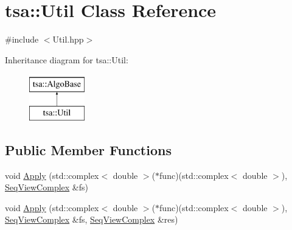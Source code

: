 \hypertarget{classtsa_1_1_util}{}\section{tsa\+:\+:Util Class Reference}
\label{classtsa_1_1_util}


{\ttfamily \#include $<$Util.\+hpp$>$}

Inheritance diagram for tsa\+:\+:Util\+:\begin{figure}[H]
\begin{center}
\leavevmode
\includegraphics[height=2.000000cm]{classtsa_1_1_util}
\end{center}
\end{figure}
\subsection*{Public Member Functions}
\begin{DoxyCompactItemize}
\item 
void \hyperlink{classtsa_1_1_util_a739335d45cc8262c48457f760844b57e}{Apply} (std\+::complex$<$ double $>$($\ast$func)(std\+::complex$<$ double $>$), \hyperlink{namespacetsa_ab32775c889b53c40fa83939f22372b75}{Seq\+View\+Complex} \&fs)
\item 
void \hyperlink{classtsa_1_1_util_af2b974e7bd7581f138b00db9640b3813}{Apply} (std\+::complex$<$ double $>$($\ast$func)(std\+::complex$<$ double $>$), \hyperlink{namespacetsa_ab32775c889b53c40fa83939f22372b75}{Seq\+View\+Complex} \&fs, \hyperlink{namespacetsa_ab32775c889b53c40fa83939f22372b75}{Seq\+View\+Complex} \&res)
\end{DoxyCompactItemize}
